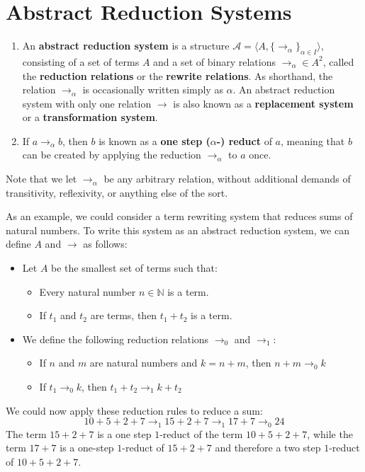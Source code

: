 \documentclass{report}
\begin{document}
\section{Abstract Reduction Systems}
\begin{definition}
\hphantom{}
\begin{enumerate}
 \item An \textbf{abstract reduction system} is a structure $\mathcal{A} = \langle A, \{\rightarrow_{\alpha}\}_{\alpha \in I}\rangle$, consisting of a set of terms $A$ and a set of binary relations $\rightarrow_{\alpha} \in A^2$, called the \textbf{reduction relations} or the \textbf{rewrite relations}. As shorthand, the relation $\rightarrow_{\alpha}$ is occasionally written simply as $\alpha$. An abstract reduction system with only one relation $\rightarrow$ is also known as a \textbf{replacement system} or a \textbf{transformation system}.
 \item If $a \rightarrow_\alpha b$, then $b$ is known as a \textbf{one step ($\alpha$-) reduct} of $a$, meaning that $b$ can be created by applying the reduction $\rightarrow_\alpha$ to $a$ once.
 \end{enumerate}
\end{definition}
%
Note that we let $\rightarrow_\alpha$ be any arbitrary relation, without additional demands of transitivity, reflexivity, or anything else of the sort.
\begin{example}
As an example, we could consider a term rewriting system that reduces sums of natural numbers. To write this system as an abstract reduction system, we can define $A$ and $\rightarrow$ as follows:
\begin{itemize}
 \item Let $A$ be the smallest set of terms such that:
 \begin{itemize}
 \item Every natural number $n \in \mathbb{N}$ is a term.
 \item If $t_1$ and $t_2$ are terms, then $t_1 + t_2$ is a term.
 \end{itemize}
 \item We define the following reduction relations $\to_0$ and $\to_1$:
 \begin{itemize}
  \item If $n$ and $m$ are natural numbers and $k = n+m$, then $n + m \rightarrow_0 k$
  \item If $t_1 \to_0 k$, then $t_1 + t_2 \to_{1} k + t_2$
 \end{itemize}
\end{itemize}
We could now apply these reduction rules to reduce a sum:
\begin{equation*}
 10+5+2+7 \to_1 15 + 2 + 7 \to_1 17 + 7 \to_0 24
\end{equation*}
The term $15+2+7$ is a one step $1$-reduct of the term $10+5+2+7$, while the term $17+7$ is a one-step $1$-reduct of $15+2+7$ and therefore a two step $1$-reduct of $10+5+2+7$.
\end{example}
\end{document}
